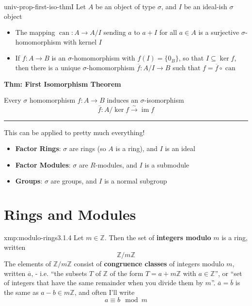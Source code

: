 \documentclass[landscape, 8pt]{extarticle}
\DeclareMathOperator{\im}{im}
\DeclareMathOperator{\can}{can}
\begin{document}
\begin{multicols}{3}
\begin{thm}{univ-prop-first-iso-thm}{I}
    Let $A$ be an object of type $\sigma$, and $I$ be an ideal-ish $\sigma$ object
    \vspace{-5pt}
    \begin{itemize}
        \item The mapping $\can : A \to A /I$ sending $a$ to $a + I$ for all $a\in A$ is a surjective $\sigma$-homomorphism with kernel $I$
        \item If $f : A \to B$ is an $\sigma$-homomorphism with $f(I) = \{0_{B}\}$, so that $I\subseteq \ker f$, then there is a unique $\sigma$-homomorphism $\overline{f} : A / I \to B$ such that $f = \overline{f} \circ \can$
    \end{itemize}
    
    \vspace{-5pt}
    \textbf{Thm: First Isomorphism Theorem}

    Every $\sigma$ homomorphism $f : A \to B$ induces an $\sigma$-isomorphism
    \[\overline{f} : A / \ker f \xrightarrow{\sim} \im f\]

    \vspace{-5pt}
    \noindent\rule{\textwidth}{0.2pt}
    This can be applied to pretty much everything!
    \vspace{-5pt}
    \begin{itemize}[leftmargin=*]
        \setlength\itemsep{0em}
        \item \textbf{Factor Rings}: $\sigma$ are rings (so $A$ is a ring), and $I$ is an ideal
        \item \textbf{Factor Modules}: $\sigma$ are $R$-modules, and $I$ is a submodule
        \item \textbf{Groups}: $\sigma$ are groups, and $I$ is a normal subgroup
    \end{itemize}
\end{thm}


\newpage
\section{Rings and Modules}

\vspace{-5pt}
\begin{xmp}{xmp:modulo-rings}{3.1.4}
    \vspace{-5pt}
    Let $m\in \mathbb{Z}$. Then the set of \textbf{integers modulo} $m$ is a ring, written
    \[\mathbb{Z} / m\mathbb{Z}\]
     The elements of $\mathbb{Z} / m\mathbb{Z}$ consist of \textbf{congruence classes} of integers modulo $m$, written $\overline{a}$, - i.e. ``the subsets $T$ of $\mathbb{Z}$ of the form $T = a + m\mathbb{Z}$ with $a\in \mathbb{Z}$'', or ``set of integers that have the same remainder when you divide them by $m$''. $\overline{a} = \overline{b}$ is the same as $a-b\in m\mathbb{Z}$, and often I'll write
    \[a \equiv b \mod m\]


\end{xmp}
\end{multicols}
\end{document}
